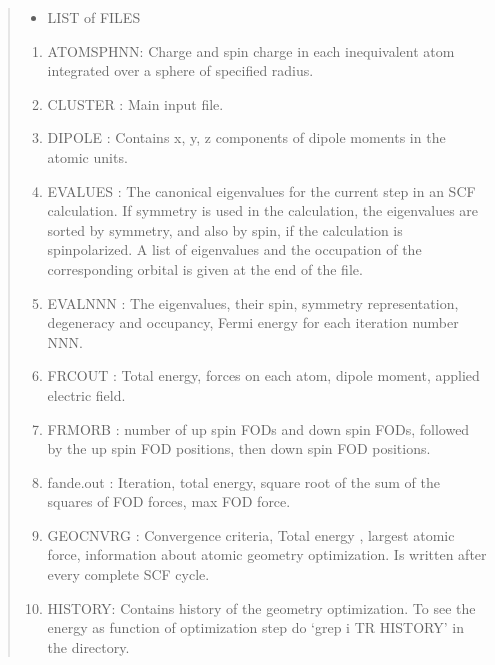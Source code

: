 \documentclass[letterpaper,10pt,english,openany,oneside]{sphinxmanual}
\begin{document}
\begin{quote}
\begin{itemize}
\item {} 
\sphinxAtStartPar
LIST of FILES

\end{itemize}
\begin{enumerate}
%
\item {} 
\sphinxAtStartPar
ATOMSPHNN: Charge and spin charge in each inequivalent atom integrated over a sphere of
specified  radius.

\item {} 
\sphinxAtStartPar
CLUSTER  : Main input file.

\item {} 
\sphinxAtStartPar
DIPOLE  : Contains x, y, z components of dipole moments in the atomic units.

\item {} 
\sphinxAtStartPar
EVALUES : The canonical eigenvalues for the current step in an SCF calculation.
If symmetry is used in the calculation, the eigenvalues are sorted by symmetry, and also by spin, if the calculation is spin\sphinxhyphen{}polarized.
A list of eigenvalues and the occupation of the corresponding orbital is given at the end of the file.

\item {} 
\sphinxAtStartPar
EVALNNN : The eigenvalues, their spin, symmetry representation, degeneracy and occupancy,
Fermi energy for each iteration number NNN.

\item {} 
\sphinxAtStartPar
FRCOUT   : Total energy, forces on each atom, dipole moment, applied electric field.

\item {} 
\sphinxAtStartPar
FRMORB : number of up spin FODs and down spin FODs, followed by the up spin FOD positions, then down spin FOD positions.

\item {} 
\sphinxAtStartPar
fande.out : Iteration, total energy, square root of the sum of the squares of FOD forces, max FOD force.

\item {} 
\sphinxAtStartPar
GEOCNVRG : Convergence criteria, Total energy , largest atomic force, information about atomic geometry
optimization.  Is written after every complete SCF cycle.

\item {} 
\sphinxAtStartPar
HISTORY:   Contains history of the geometry optimization. To see the energy as function of optimization step
do ‘grep \sphinxhyphen{}i TR HISTORY’ in the directory.


\end{enumerate}
\end{quote}
\end{document}
